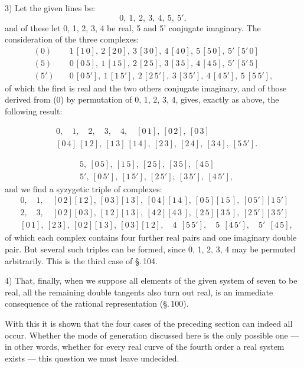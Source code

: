 
3) Let the given lines be:
\[
0,\ 1,\ 2,\ 3,\ 4,\ 5,\ 5',
\]
and of these let 0, 1, 2, 3, 4 be real, 5 and 5' conjugate imaginary. The
consideration of the three complexes:
\[
\begin{aligned}
(0)\quad & 1\,[1\,0],\ 2\,[2\,0],\ 3\,[3\,0],\ 4\,[4\,0],\ 5\,[5\,0],\ 5'\,[5'\,0] \\
(5)\quad & 0\,[0\,5],\ 1\,[1\,5],\ 2\,[2\,5],\ 3\,[3\,5],\ 4\,[4\,5],\ 5'\,[5'\,5] \\
(5')\quad & 0\,[0\,5'],\ 1\,[1\,5'],\ 2\,[2\,5'],\ 3\,[3\,5'],\ 4\,[4\,5'],\ 5\ [5\,5'],
\end{aligned}
\]
of which the first is real and the two others conjugate imaginary,
and of those derived from (0) by permutation of 0, 1, 2, 3, 4,
gives, exactly as above, the following result:

\begin{center}
\end{center}
\[
\begin{aligned}
&0,\quad 1,\quad 2,\quad 3,\quad 4,\quad [0\,1],\ [0\,2],\ [0\,3] \\
&[0\,4]\ [1\,2],\ [1\,3]\ [1\,4],\ [2\,3],\ [2\,4],\ [3\,4],\ [5\,5'].
\end{aligned}
\]

\begin{center}
\end{center}
\[
\begin{aligned}
&5,\ [0\,5],\ [1\,5],\ [2\,5],\ [3\,5],\ [4\,5] \\
&5',\ [0\,5'],\ [1\,5'],\ [2\,5'];\ [3\,5'],\ [4\,5'], %
\end{aligned}
\]
and we find a syzygetic triple of complexes:
\[
\begin{aligned}
&0,\quad 1,\quad [0\,2][1\,2],\ [0\,3][1\,3],\ [0\,4][1\,4\,],\ [0\,5][1\,5\,],\ [0\,5'][1\,5'] \\
&2,\quad 3,\quad [0\,2][0\,3],\ [1\,2][1\,3],\ [4\,2][4\,3\,],\ [2\,5][3\,5\,],\ [2\,5'][3\,5'] \\
&[0\,1],\ [2\,3],\ [0\,2][1\,3],\ [0\,3][1\,2],\quad 4\ \ [5\,5'],\quad 5\ \ [4\,5'],\quad 5'\ \ [4\,5],
\end{aligned}
\]
of which each complex contains four further real pairs and one
imaginary double pair. But several such triples can be formed,
since 0, 1, 2, 3, 4 may be permuted arbitrarily.
This is the third case of \S.\,104.

4) That, finally, when we suppose all elements of the given
system of seven to be real, all the remaining double tangents
also turn out real, is an immediate consequence of the rational
representation (\S.\,100).

With this it is shown that the four cases of the preceding
section can indeed all occur. Whether the mode of generation
discussed here is the only possible one — in other
words, whether for every real curve of the fourth order a real
 system exists — this question we must leave
undecided.
